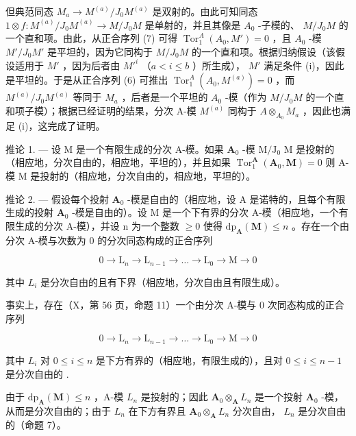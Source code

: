 但典范同态 \(M_{a} \to M^{(a)}/J_{0} M^{(a)}\) 是双射的。由此可知同态 \(1 \otimes f : M^{(a)}/J_{0} M^{(a)} \to M/J_{0} M\) 是单射的，并且其像是 \(A_{0}\) -子模的、 \(M/J_{0} M\) 的一个直和项。由此，从正合序列 (7) 可得 \(\operatorname{Tor}_{1}^{A}(A_{0}, M') = 0\) ，且 \(A_{0}\) -模 \(M'/J_{0} M'\) 是平坦的，因为它同构于 \(M/J_{0} M\) 的一个直和项。根据归纳假设（该假设适用于 \(M'\) ，因为后者由 \(M'^{i}\) （\(a < i \leqslant b\) ）所生成）， \(M'\) 满足条件 (i)，因此是平坦的。于是从正合序列 (6) 可推出 \(\operatorname{Tor}_{1}^{A}(A_{0}, M^{(a)}) = 0\) ，而 \(M^{(a)}/J_{0} M^{(a)}\) 等同于 \(M_{a}\) ，后者是一个平坦的 \(A_{0}\) -模（作为 \(M/J_{0} M\) 的一个直和项子模）；根据已经证明的结果，分次 A-模 \(M^{(a)}\) 同构于 \(A \otimes_{A_{0}} M_{a}\) ，因此也满足 (i)，这完成了证明。

推论 1. --- 设 M 是一个有限生成的分次 A-模。如果 \(\mathbf{A}_0\) -模 \(\mathrm{M} / \mathrm{J}_0\) M 是投射的（相应地，分次自由的，相应地，平坦的），并且如果 \(\operatorname{Tor}_1^{\mathbf{A}}(\mathbf{A}_0, \mathbf{M}) = 0\) 则 A-模 M 是投射的（相应地，分次自由的，相应地，平坦的）。

推论 2. --- 假设每个投射 \(\mathbf{A}_{0}\) -模是自由的（相应地，设 A 是诺特的，且每个有限生成的投射 \(\mathbf{A}_{0}\) -模是自由的）。设 M 是一个下有界的分次 A-模（相应地，一个有限生成的分次 A-模），并设 n 为一个整数 \(\geqslant 0\) 使得 \(\mathrm{dp}_{\mathbf{A}}(\mathbf{M}) \leqslant n\) 。存在一个由分次 A-模与次数为 0 的分次同态构成的正合序列

\[
0 \rightarrow \mathrm{L} _ {n} \rightarrow \mathrm{L} _ {n - 1} \rightarrow \dots \rightarrow \mathrm{L} _ {0} \rightarrow \mathrm{M} \rightarrow 0
\]

其中 \(L_{i}\) 是分次自由的且有下界（相应地，分次自由且有限生成）。

事实上，存在（X，第 56 页，命题 11）一个由分次 A-模与 0 次同态构成的正合序列

\[
0 \to \mathrm{L} _ {n} \to \mathrm{L} _ {n - 1} \to \dots \to \mathrm{L} _ {0} \to \mathrm{M} \to 0
\]

其中 \(L_{i}\) 对 \(0 \leqslant i \leqslant n\) 是下方有界的（相应地，有限生成的），且对 \(0 \leqslant i \leqslant n - 1\) 是分次自由的 .

由于 \(\mathrm{dp}_{\mathbf{A}}(\mathbf{M}) \leqslant n\) ，A-模 \(L_{n}\) 是投射的；因此 \(\mathbf{A}_0 \otimes_{\mathbf{A}} L_n\) 是一个投射 \(\mathbf{A}_0\) -模，从而是分次自由的；由于 \(L_{n}\) 在下方有界且 \(\mathbf{A}_0 \otimes_{\mathbf{A}} L_n\) 分次自由， \(L_{n}\) 是分次自由的（命题 7）。

